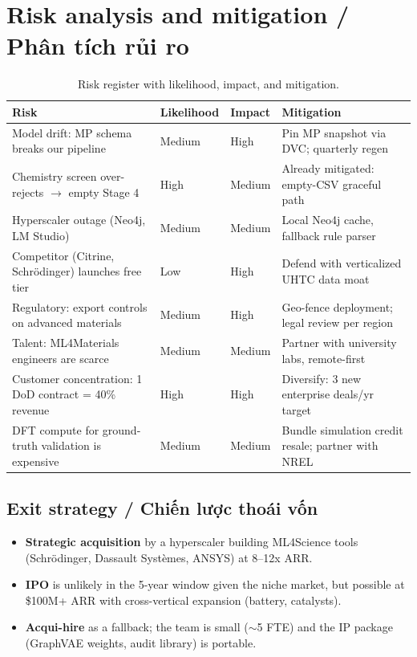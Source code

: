 \documentclass[11pt,a4paper]{report}
\begin{document}
\chapter{Risk analysis and mitigation / Phân tích rủi ro}

\begin{table}[h]
\centering
\caption{Risk register with likelihood, impact, and mitigation.}
\label{tab:risk}
\small
\begin{tabular}{p{3.6cm}p{2.4cm}p{1.6cm}p{6.6cm}}
\toprule
\textbf{Risk} & \textbf{Likelihood} & \textbf{Impact} & \textbf{Mitigation} \\
\midrule
Model drift: MP schema breaks our pipeline & Medium & High & Pin MP snapshot via DVC; quarterly regen \\
Chemistry screen over-rejects $\to$ empty Stage 4 & High & Medium & Already mitigated: empty-CSV graceful path \\
Hyperscaler outage (Neo4j, LM Studio) & Medium & Medium & Local Neo4j cache, fallback rule parser \\
Competitor (Citrine, Schrödinger) launches free tier & Low & High & Defend with verticalized UHTC data moat \\
Regulatory: export controls on advanced materials & Medium & High & Geo-fence deployment; legal review per region \\
Talent: ML4Materials engineers are scarce & Medium & Medium & Partner with university labs, remote-first \\
Customer concentration: 1 DoD contract = 40\% revenue & High & High & Diversify: 3 new enterprise deals/yr target \\
DFT compute for ground-truth validation is expensive & Medium & Medium & Bundle simulation credit resale; partner with NREL \\
\bottomrule
\end{tabular}
\end{table}

\section{Exit strategy / Chiến lược thoái vốn}

\begin{itemize}[leftmargin=*,itemsep=2pt]
\item \textbf{Strategic acquisition} by a hyperscaler building ML4Science tools
      (Schrödinger, Dassault Systèmes, ANSYS) at 8--12x ARR.
\item \textbf{IPO} is unlikely in the 5-year window given the niche market, but possible at
      \$100M+ ARR with cross-vertical expansion (battery, catalysts).
\item \textbf{Acqui-hire} as a fallback; the team is small ($\sim$5 FTE) and the
      IP package (GraphVAE weights, audit library) is portable.
\end{itemize}
\end{document}
